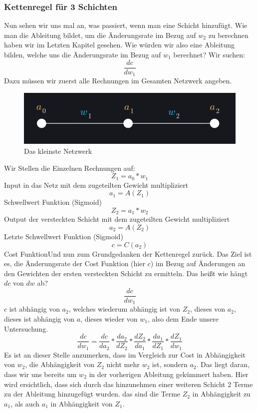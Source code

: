\documentclass[12pt]{article}
\begin{document}
\subsubsection{Kettenregel für 3 Schichten}Nun sehen wir uns mal an, was passiert, wenn man eine Schicht hinzufügt. Wie man die Ableitung bildet, um die Änderungsrate im Bezug auf $w_2$ zu berechnen haben wir im Letzten Kapitel gesehen. Wie würden wir also eine Ableitung bilden, welche uns die Änderungsrate im Bezug auf $w_1$ berechnet?
Wir suchen:$$\frac{ dc }{ dw_{ 1 } }$$
Dazu müssen wir zuerst alle Rechnungen im Gesamten Netzwerk angeben.
\begin{figure}[H]
\centering
\includegraphics[scale=0.40]{./Images/Pasted image 20230912184748.png}
\caption{Das kleinste Netzwerk}
\label{Was kommt hier rein?}
\end{figure}
Wir Stellen die Einzelnen Rechnungen auf:
$$Z_1 = a_0*w_1$$
Input in das Netz mit dem zugeteilten Gewicht multipliziert
$$a_1=A(Z_1)$$
Schwellwert Funktion (Sigmoid)
$$Z_2=a_1*w_2$$
Output der versteckten Schicht mit dem zugeteilten Gewicht  multipliziert
$$a_2=A(Z_2)$$
Letzte Schwellwert Funktion (Sigmoid)
$$c=C(a_2)$$
Cost FunktionUnd nun zum Grundgedanken der Kettenregel zurück. Das Ziel ist es, die Änderungsrate der Cost Funktion (hier $c$) im Bezug auf Änderungen an den Gewichten der ersten versteckten Schicht zu ermitteln. Das heißt wie hängt $dc$ von $dw$ ab?
$$\frac{dc}{dw_1}$$
$c$ ist abhängig von $a_2$, welches wiederum abhängig ist von $Z_2$, dieses von $a_2$, dieses ist abhängig von $a$, dieses wieder von $w_1$, also dem Ende unsere Untersuchung.
$$\frac{ dc }{ dw_{ 1 } }=
\frac{ dc }{ da_{ 2 } }*
\frac{ da_{ 2 } }{ dZ_{ 2 } }*
\frac{ dZ_{ 2 } }{ da_{ 1 } }*
\frac{ da_{ 1 } }{ dZ_{ 1 } }*
\frac{ dZ_{ 1 } }{ dw_{ 1 } }$$
Es ist an dieser Stelle anzumerken, dass im Vergleich zur Cost in Abhängigkeit von $w_2$, die Abhängigkeit von $Z_2$ nicht mehr $w_2$ ist, sondern $a_2$. Das liegt daran, dass wir uns bereits um $w_2$ in der vorherigen Ableitung gekümmert haben.
Hier wird ersichtlich, dass sich durch das hinzunehmen einer weiteren Schicht 2 Terme zu der Ableitung hinzugefügt wurden. das sind die Terme $Z_2$ in Abhängigkeit zu $a_1$, als auch $a_1$ in Abhängigkeit von $Z_1$. 
\end{document}
